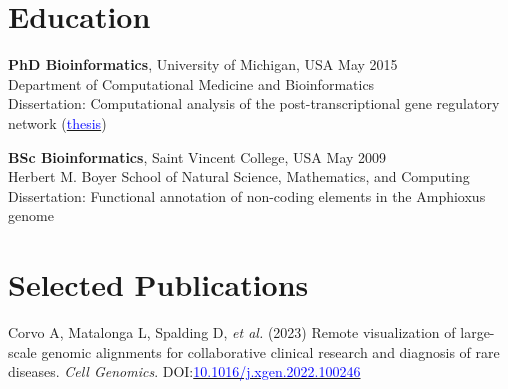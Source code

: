 \documentclass[margin,line]{res}
\begin{document}
\begin{resume}


\section{\sc Education}
{\bf PhD Bioinformatics}, University of Michigan, USA \hfill {May 2015}\\
Department of Computational Medicine and Bioinformatics\\ 
Dissertation: Computational analysis of the post-transcriptional gene regulatory network (\href{https://deepblue.lib.umich.edu/bitstream/handle/2027.42/111339/mafree_1.pdf?sequence=1&isAllowed=y}{\textcolor{blue}{thesis}})

{\bf BSc Bioinformatics}, Saint Vincent College, USA \hfill {May 2009}\\
Herbert M. Boyer School of Natural Science, Mathematics, and Computing\\
Dissertation: Functional annotation of non-coding elements in the Amphioxus genome

\section{\sc Selected Publications}

Corvo A, Matalonga L, Spalding D, {\em et al.} (2023) Remote visualization of large-scale genomic alignments for collaborative clinical research and diagnosis of rare diseases. {\em Cell Genomics}. DOI:\href{https://doi.org/10.1016/j.xgen.2022.100246}{\textcolor{blue}{10.1016/j.xgen.2022.100246}}


\end{resume}
\end{document}
